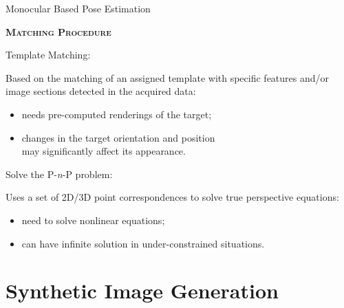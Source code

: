 \documentclass[10pt]{beamer}
\begin{document}
\begin{frame}{Monocular Based Pose Estimation}

  \bigskip

  \textsc{\textbf{\large Matching Procedure}}

  \begin{minipage}[t]{0.4\textwidth}
    \vspace{0.01mm}
    Template Matching:
  \end{minipage}%
  \begin{minipage}[t]{0.6\textwidth}
    \vspace{0.01mm}
    Based on the matching of an assigned template with specific features and/or image sections detected in the acquired data:
    \smallskip
    \footnotesize{\begin{itemize}[leftmargin=0.8cm,label=-]
        \item needs pre-computed renderings of the target;
        \item changes in the target orientation and position \\ may significantly affect its appearance.
      \end{itemize}}
  \end{minipage}

  \bigskip

  \begin{minipage}[t]{0.4\textwidth}
    \vspace{0.01mm}
    Solve the P-\textit{n}-P problem:
  \end{minipage}%
  \begin{minipage}[t]{0.6\textwidth}
    \vspace{0.01mm}
    Uses a set of 2D/3D point correspondences to solve true perspective equations:
    \smallskip
    \footnotesize{\begin{itemize}[leftmargin=0.8cm,label=-]
        \item need to solve nonlinear equations;
        \item can have infinite solution in under-constrained situations.
      \end{itemize}}
  \end{minipage}

  \bigskip

\end{frame}

\section{Synthetic Image Generation}
\begin{frame}[plain]{}
  \sectionpage
\end{frame}
\end{document}
